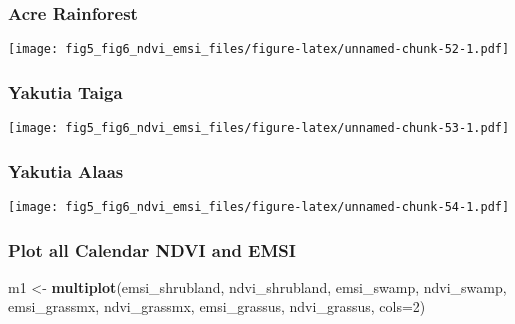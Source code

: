 \documentclass[
]{article}
\newenvironment{Shaded}{\begin{snugshade}}{\end{snugshade}}
\newcommand{\DataTypeTok}[1]{\textcolor[rgb]{0.13,0.29,0.53}{#1}}
\newcommand{\DecValTok}[1]{\textcolor[rgb]{0.00,0.00,0.81}{#1}}
\newcommand{\KeywordTok}[1]{\textcolor[rgb]{0.13,0.29,0.53}{\textbf{#1}}}
\newcommand{\NormalTok}[1]{#1}
\newcommand{\StringTok}[1]{\textcolor[rgb]{0.31,0.60,0.02}{#1}}
\begin{document}
\hypertarget{htmlwidget-e3090adce76f3ebf7fc4}{}
\begin{plotly}

\end{plotly}

\hypertarget{acre-rainforest-3}{%
\subsubsection{Acre Rainforest}\label{acre-rainforest-3}}

\texttt{[image: fig5\_fig6\_ndvi\_emsi\_files/figure-latex/unnamed-chunk-52-1.pdf]}

\hypertarget{htmlwidget-588914b52f32cf781384}{}
\begin{plotly}

\end{plotly}

\hypertarget{yakutia-taiga-3}{%
\subsubsection{Yakutia Taiga}\label{yakutia-taiga-3}}

\texttt{[image: fig5\_fig6\_ndvi\_emsi\_files/figure-latex/unnamed-chunk-53-1.pdf]}

\hypertarget{htmlwidget-68dc6c1326533dcd4753}{}
\begin{plotly}

\end{plotly}

\hypertarget{yakutia-alaas-3}{%
\subsubsection{Yakutia Alaas}\label{yakutia-alaas-3}}

\texttt{[image: fig5\_fig6\_ndvi\_emsi\_files/figure-latex/unnamed-chunk-54-1.pdf]}

\hypertarget{htmlwidget-606f69d39ccf38be3fff}{}
\begin{plotly}

\end{plotly}

\hypertarget{plot-all-calendar-ndvi-and-emsi}{%
\subsubsection{Plot all Calendar NDVI and
EMSI}\label{plot-all-calendar-ndvi-and-emsi}}

\begin{Shaded}
\begin{Highlighting}[]
\NormalTok{m1 <-}\StringTok{ }\KeywordTok{multiplot}\NormalTok{(emsi_shrubland, ndvi_shrubland, emsi_swamp, ndvi_swamp, emsi_grassmx, ndvi_grassmx, emsi_grassus, ndvi_grassus, }\DataTypeTok{cols=}\DecValTok{2}\NormalTok{)}
\end{Highlighting}
\end{Shaded}
\end{document}
